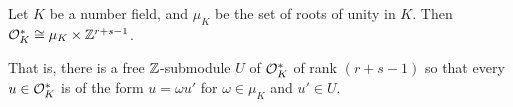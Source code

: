 \documentclass[11pt]{report}
\begin{document}
\begin{theorem}\label{dirunit}
    Let $K$ be a number field, and $\mu_K$ be the set of roots of unity in $K$. Then $\mathcal{O}_K^* \cong \mu_K \times \mathbb{Z}^{r + s - 1}$.
\end{theorem}
That is, there is a free $\mathbb{Z}$-submodule $U$ of $\mathcal{O}_K^*$ of rank $(r + s - 1)$ so that every $u \in \mathcal{O}_K^*$ is of the form $u = \omega u'$ for $\omega \in \mu_K$ and $u' \in U$.









\end{document}
